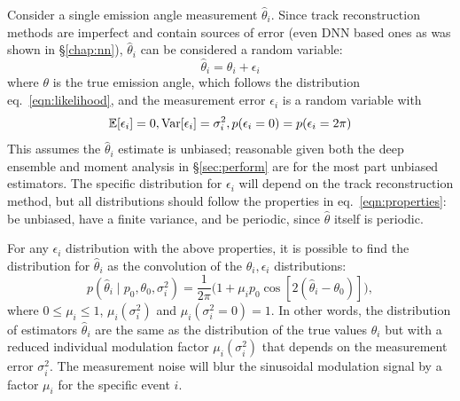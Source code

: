 Consider a single emission angle measurement $\hat{\theta}_i$. Since track reconstruction methods are imperfect and contain sources of error (even DNN based ones as was shown in \S\ref{chap:nn}), $\hat{\theta}_i$ can be considered a random variable:
\begin{equation}
    \hat{\theta}_i = \theta_i + \epsilon_i
\end{equation}
where $\theta$ is the true emission angle, which follows the distribution eq.~\ref{eqn:likelihood}, and the measurement error $\epsilon_i$ is a random variable with  
\begin{equation}
\label{eqn:properties}
    \mathbb{E}[\epsilon_i] = 0, {\rm Var}[\epsilon_i] = \sigma^2_i, p(\epsilon_i=0) = p(\epsilon_i = 2\pi) 
\end{equation}
This assumes the $\hat{\theta}_i$ estimate is unbiased; reasonable given both the deep ensemble and moment analysis in \S\ref{sec:perform} are for the most part unbiased estimators. 
The specific distribution for $\epsilon_i$ will depend on the track reconstruction method, but all distributions should follow the properties in eq.~\ref{eqn:properties}: be unbiased, have a finite variance, and be periodic, since $\hat{\theta}$ itself is periodic. 

For any $\epsilon_i$ distribution with the above properties, it is possible to find the distribution for $\hat{\theta}_i$ as the convolution of the $\theta_i, \epsilon_i$ distributions:
\begin{equation}
    p(\hat{\theta}_i\mid p_0,\theta_0,\sigma_i^2) = \frac{1}{2\pi} \big(1 + \mu_ip_0\cos[2(\hat{\theta}_i - \theta_0)] \big),
    \label{eqn:individual}
\end{equation}
where $0 \leq \mu_i \leq 1$, $\mu_i(\sigma^2_i)$ and $\mu_i(\sigma_i^2 = 0) = 1$.
In other words, the distribution of estimators $\hat{\theta}_i$ are the same as the distribution of the true values $\theta_i$ but with a reduced individual modulation factor $\mu_i(\sigma^2_i)$ that depends on the measurement error $\sigma^2_i$. The measurement noise will blur the sinusoidal modulation signal by a factor $\mu_i$ for the specific event $i$. 

